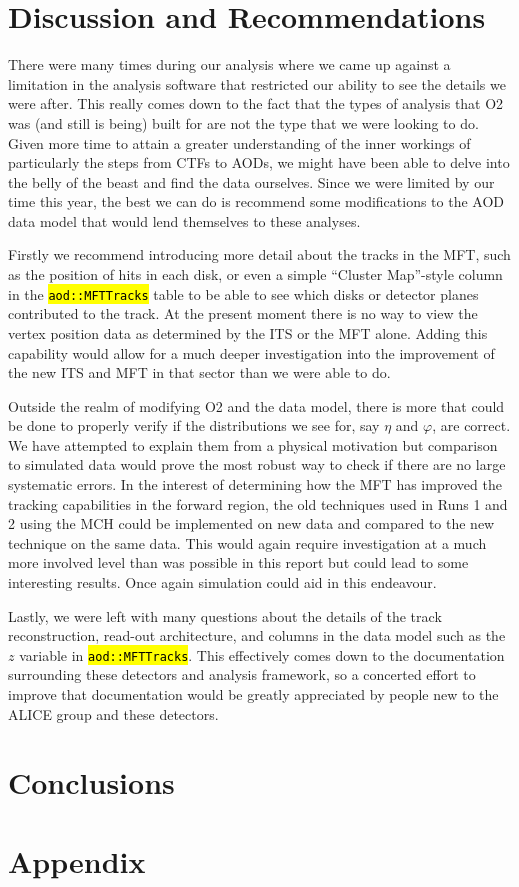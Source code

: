 \documentclass[11pt]{article}
\numberwithin{equation}{section}
\numberwithin{figure}{section}
\numberwithin{table}{section}
\let\OldTexttt\texttt
\renewcommand{\texttt}[1]{\OldTexttt{\hl{#1}}}
\begin{document}
\section{Discussion and Recommendations}


There were many times during our analysis where we came up against a limitation in the analysis software that restricted our ability to see the details we were after. This really comes down to the fact that the types of analysis that O2 was (and still is being) built for are not the type that we were looking to do. Given more time to attain a greater understanding of the inner workings of particularly the steps from CTFs to AODs, we might have been able to delve into the belly of the beast and find the data ourselves. Since we were limited by our time this year, the best we can do is recommend some modifications to the AOD data model that would lend themselves to these analyses. 

Firstly we recommend introducing more detail about the tracks in the MFT, such as the position of hits in each disk, or even a simple ``Cluster Map''-style column in the \texttt{aod::MFTTracks} table to be able to see which disks or detector planes contributed to the track. At the present moment there is no way to view the vertex position data as determined by the ITS or the MFT alone. Adding this capability would allow for a much deeper investigation into the improvement of the new ITS and MFT in that sector than we were able to do.

Outside the realm of modifying O2 and the data model, there is more that could be done to properly verify if the distributions we see for, say $\eta$ and $\varphi$, are correct. We have attempted to explain them from a physical motivation but comparison to simulated data would prove the most robust way to check if there are no large systematic errors. In the interest of determining how the MFT has improved the tracking capabilities in the forward region, the old techniques used in Runs 1 and 2 using the MCH could be implemented on new data and compared to the new technique on the same data. This would again require investigation at a much more involved level than was possible in this report but could lead to some interesting results. Once again simulation could aid in this endeavour. 

Lastly, we were left with many questions about the details of the track reconstruction, read-out architecture, and columns in the data model such as the $z$ variable in \texttt{aod::MFTTracks}. This effectively comes down to the documentation surrounding these detectors and analysis framework, so a concerted effort to improve that documentation would be greatly appreciated by people new to the ALICE group and these detectors. 

\section{Conclusions}



\newpage
\printbibliography

\newpage
\section*{Appendix}
\appendix

\end{document}
